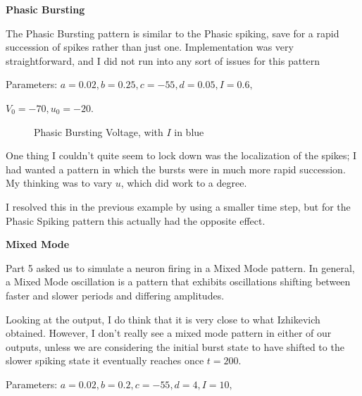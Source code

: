 \documentclass[a4paper,12pt]{article}
\begin{document}
\vfil\eject

{\bf Phasic Bursting}
\bigskip

The Phasic Bursting pattern is similar to the Phasic spiking, save for a rapid succession of spikes rather than just one. Implementation was very straightforward, and I did not run into any sort of issues for this pattern

\vspace{2mm}

Parameters: $a=0.02, b=0.25, c=-55, d=0.05, I=0.6, $

\vspace{1mm}

$V_{0}=-70, u_{0}=-20$. 

\begin{figure}[h!]
\begin{center}
\end{center}
\caption{\label{pict4}Phasic Bursting Voltage, with $I$ in blue}
\end{figure}

One thing I couldn't quite seem to lock down was the localization of the spikes; I had wanted a pattern in which the bursts were in much more rapid succession. My thinking was to vary $u$, which did work to a degree. 

\vspace{2mm}

I resolved this in the previous example by using a smaller time step, but for the Phasic Spiking pattern this actually had the opposite effect. 

\vfil\eject

{\bf Mixed Mode}
\bigskip

Part 5 asked us to simulate a neuron firing in a Mixed Mode pattern. In general, a Mixed Mode oscillation is a pattern that exhibits oscillations shifting between faster and slower periods and differing amplitudes.

\vspace{2mm}

Looking at the output, I do think that it is very close to what Izhikevich obtained. However, I don't really see a mixed mode pattern in either of our outputs, unless we are considering the initial burst state to have shifted to the slower spiking state it eventually reaches once $t=200$. 
\vspace{2mm} 

Parameters: $a=0.02, b=0.2, c=-55, d=4, I=10, $

\vspace{1mm}
\end{document}
